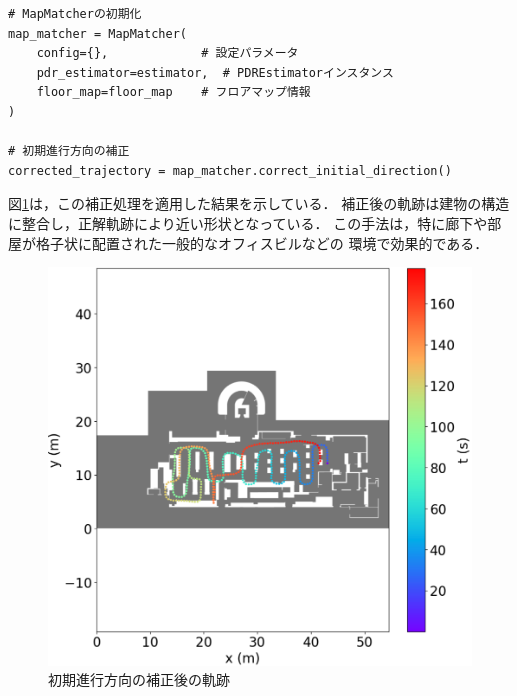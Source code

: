 \begin{lstlisting}
# MapMatcherの初期化
map_matcher = MapMatcher(
    config={},             # 設定パラメータ
    pdr_estimator=estimator,  # PDREstimatorインスタンス
    floor_map=floor_map    # フロアマップ情報
)

# 初期進行方向の補正
corrected_trajectory = map_matcher.correct_initial_direction()
\end{lstlisting}

図\ref{fig:pdr-rotate}は，この補正処理を適用した結果を示している．
補正後の軌跡は建物の構造に整合し，正解軌跡により近い形状となっている．
この手法は，特に廊下や部屋が格子状に配置された一般的なオフィスビルなどの
環境で効果的である．

\begin{figure}[H]
	\centering
	\includegraphics[width=\linewidth]{image/pdr-rotate.jpg}
	\caption{初期進行方向の補正後の軌跡}    \label{fig:pdr-rotate}
\end{figure}



